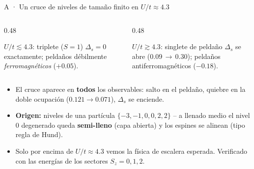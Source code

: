 \documentclass[aspectratio=169,11pt]{beamer}
\newcommand{\warn}[1]{\textcolor{qWarn}{\textbf{#1}}}
\begin{document}
\begin{frame}{A · Un cruce de niveles de tamaño finito en $U/t\approx4.3$}
  \begin{columns}[T]
    \begin{column}{0.48\textwidth}
      \begin{block}{$U/t\lesssim4.3$: triplete ($S=1$)}
        $\Delta_s=0$ exactamente; peldaños débilmente \emph{ferromagnéticos} ($+0.05$).
      \end{block}
    \end{column}
    \begin{column}{0.48\textwidth}
      \begin{block}{$U/t\gtrsim4.3$: singlete de peldaño}
        $\Delta_s$ se abre (0.09\,$\to$\,0.30); peldaños antiferromagnéticos ($-0.18$).
      \end{block}
    \end{column}
  \end{columns}
  \vspace{0.6em}
  \begin{itemize}
    \item El cruce aparece en \textbf{todos} los observables: salto en el peldaño, quiebre en la
      doble ocupación ($0.121\to0.071$), $\Delta_s$ se enciende.
    \item \textbf{Origen:} niveles de una partícula $\{-3,-1,0,0,2,2\}$ -- a llenado medio el
      nivel $0$ degenerado queda \warn{semi-lleno} (capa abierta) y los espines se alinean
      (tipo regla de Hund).
    \item Solo por encima de $U/t\approx4.3$ vemos la física de escalera esperada.
      Verificado con las energías de los sectores $S_z=0,1,2$.
  \end{itemize}
\end{frame}
\end{document}
